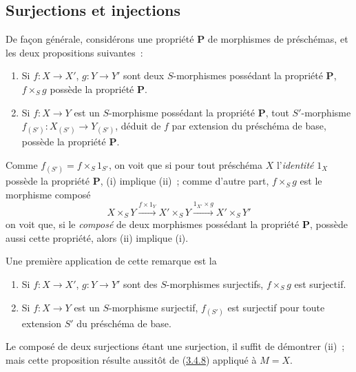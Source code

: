 \subsection{Surjections et injections}
\label{subsection:I.3.5-fr}

\begin{env}[3.5.1]
\label{I.3.5.1-fr}
De façon générale, considérons une propriété $\mathbf{P}$ de morphismes de
préschémas, et les deux propositions suivantes~:
\begin{enumerate}
  \item[(i)] Si $f:X\to X'$, $g:Y\to Y'$ sont deux $S$-morphismes possédant
  la propriété $\mathbf{P}$, $f\times_S g$ possède la propriété $\mathbf{P}$.
  \item[(ii)] Si $f:X\to Y$ est un $S$-morphisme possédant la propriété
  $\mathbf{P}$, tout $S'$-morphisme $f_{(S')}:X_{(S')}\to Y_{(S')}$, déduit
  de $f$ par extension du préschéma de base, possède la propriété
  $\mathbf{P}$.
\end{enumerate}

Comme $f_{(S')}=f\times_S 1_{S'}$, on voit que si pour tout préschéma $X$
l'\emph{identité} $1_X$ possède la propriété $\mathbf{P}$, (i) implique
(ii)~; comme d'autre part, $f\times_S g$ est le morphisme composé
\label{I.3.5.1.product-composition-fr}
\[
  X\times_S Y\xrightarrow{f\times 1_Y}X'\times_S Y
  \xrightarrow{1_{X'}\times g}X'\times_S Y'
\]
on voit que, si le \emph{composé} de deux morphismes possédant la propriété
$\mathbf{P}$, possède aussi cette propriété, alors (ii) implique (i).
\end{env}

Une première application de cette remarque est la

\begin{proposition}[3.5.2]
\label{I.3.5.2-fr}
\begin{enumerate}
  \item[(i)] Si $f:X\to X'$, $g:Y\to Y'$ sont des $S$-morphismes surjectifs,
  $f\times_S g$ est surjectif.
  \item[(ii)] Si $f:X\to Y$ est un $S$-morphisme surjectif, $f_{(S')}$ est
  surjectif pour toute extension $S'$ du préschéma de base.
\end{enumerate}
\end{proposition}

Le composé de deux surjections étant une surjection, il suffit de démontrer
(ii)~; mais cette proposition résulte aussitôt de
(\hyperref[I.3.4.8-fr]{3.4.8}) appliqué à $M=X$.

